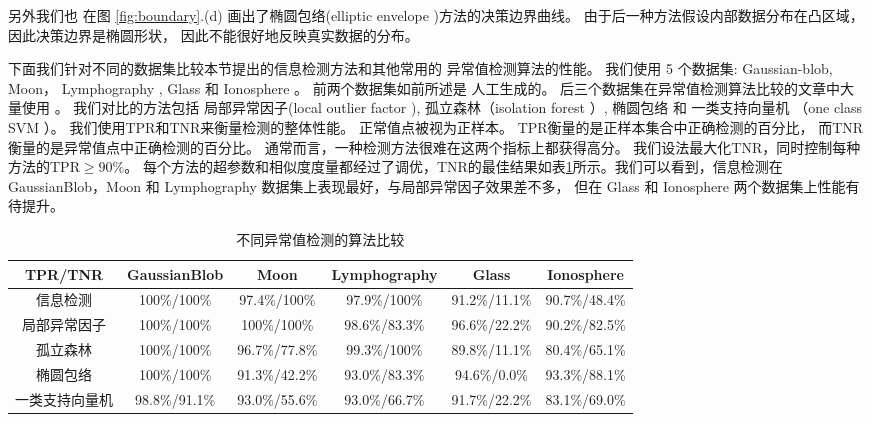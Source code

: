 另外我们也
在图 \ref{fig:boundary}.(d) 画出了椭圆包络(elliptic envelope \citep{rousseeuw1999fast} )方法的决策边界曲线。
由于后一种方法假设内部数据分布在凸区域，因此决策边界是椭圆形状，
因此不能很好地反映真实数据的分布。

下面我们针对不同的数据集比较本节提出的信息检测方法和其他常用的
异常值检测算法的性能。
我们使用 5 个数据集: Gaussian-blob, Moon， Lymphography
\cite{lazarevic2005feature}, Glass 和 Ionosphere \cite{keller2012hics}。 
前两个数据集如前所述是
人工生成的。
后三个数据集在异常值检测算法比较的文章中大量使用
\cite{campos2016evaluation}。
我们对比的方法包括
局部异常因子(local outlier factor \citep{Breunig}), 孤立森林（isolation forest \citep{if}）, 
椭圆包络  和
一类支持向量机 （one class SVM \citep{svm}）。 
我们使用TPR和TNR来衡量检测的整体性能。
正常值点被视为正样本。
TPR衡量的是正样本集合中正确检测的百分比，
而TNR衡量的是异常值点中正确检测的百分比。
通常而言，一种检测方法很难在这两个指标上都获得高分。
我们设法最大化TNR，同时控制每种方法的TPR$\geq 90\%$。
每个方法的超参数和相似度度量都经过了调优，TNR的最佳结果如表\ref{tab:odm}所示。我们可以看到，信息检测在 GaussianBlob，Moon 和
Lymphography 数据集上表现最好，与局部异常因子效果差不多，
但在 Glass 和  Ionosphere 两个数据集上性能有待提升。
\begin{table}
  \begin{adjustbox}{width=\columnwidth,center}
\begin{tabular}{cccccc}
  \hline
         TPR/TNR        &  GaussianBlob   &      Moon       &  Lymphography  &     Glass     &  Ionosphere   \\
  \hline
      信息检测    & 100\%/100\% & 97.4\%/100\%  & 97.9\%/100\% & 91.2\%/11.1\% & 90.7\%/48.4\% \\
      局部异常因子 & 100\%/100\% & 100\%/100\% & 98.6\%/83.3\%  & 96.6\%/22.2\% & 90.2\%/82.5\% \\
   孤立森林   & 100\%/100\% &  96.7\%/77.8\%  & 99.3\%/100\% & 89.8\%/11.1\% & 80.4\%/65.1\% \\
    椭圆包络   & 100\%/100\% &  91.3\%/42.2\%  & 93.0\%/83.3\%  & 94.6\%/0.0\%  & 93.3\%/88.1\% \\
     一类支持向量机     &  98.8\%/91.1\%  &  93.0\%/55.6\%  & 93.0\%/66.7\%  & 91.7\%/22.2\% & 83.1\%/69.0\% \\
  \hline
  \end{tabular}
\end{adjustbox}
\caption{不同异常值检测的算法比较}\label{tab:odm}
\end{table}

